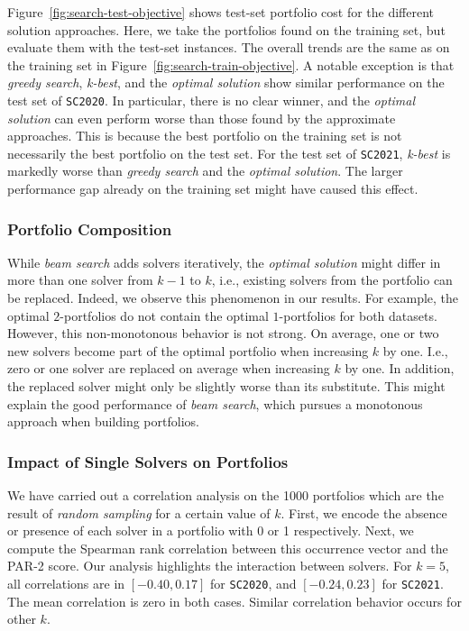 \documentclass[a4paper,USenglish,pdfa]{lipics-v2021} %
\begin{document}
Figure~\ref{fig:search-test-objective} shows test-set portfolio cost for the different solution approaches.
Here, we take the portfolios found on the training set, but evaluate them with the test-set instances.
The overall trends are the same as on the training set in Figure~\ref{fig:search-train-objective}.
A notable exception is that \emph{greedy search}, \emph{k-best}, and the \emph{optimal solution} show similar performance on the test set of \texttt{SC2020}.
In particular, there is no clear winner, and the \emph{optimal solution} can even perform worse than those found by the approximate approaches. 
This is because the best portfolio on the training set is not necessarily the best portfolio on the test set.
For the test set of \texttt{SC2021}, \emph{k-best} is markedly worse than \emph{greedy search} and the \emph{optimal solution}. 
The larger performance gap already on the training set might have caused this effect.

\subsubsection{Portfolio Composition}

While \emph{beam search} adds solvers iteratively, the \emph{optimal solution} might differ in more than one solver from $k-1$ to $k$, i.e., existing solvers from the portfolio can be replaced.
Indeed, we observe this phenomenon in our results.
For example, the optimal $2$-portfolios do not contain the optimal $1$-portfolios for both datasets.
However, this non-monotonous behavior is not strong.
On average, one or two new solvers become part of the optimal portfolio when increasing $k$ by one.
I.e., zero or one solver are replaced on average when increasing $k$ by one.
In addition, the replaced solver might only be slightly worse than its substitute.
This might explain the good performance of \emph{beam search}, which pursues a monotonous approach when building portfolios.

\subsubsection{Impact of Single Solvers on Portfolios}

We have carried out a correlation analysis on the 1000 portfolios which are the result of \emph{random sampling} for a certain value of $k$. 
First, we encode the absence or presence of each solver in a portfolio with 0 or 1 respectively.
Next, we compute the Spearman rank correlation between this occurrence vector and the PAR-2 score.
Our analysis highlights the interaction between solvers. 
For $k=5$, all correlations are in $[-0.40,0.17]$ for \texttt{SC2020}, and $[-0.24,0.23]$ for \texttt{SC2021}.
The mean correlation is zero in both cases.
Similar correlation behavior occurs for other $k$.
\end{document}
